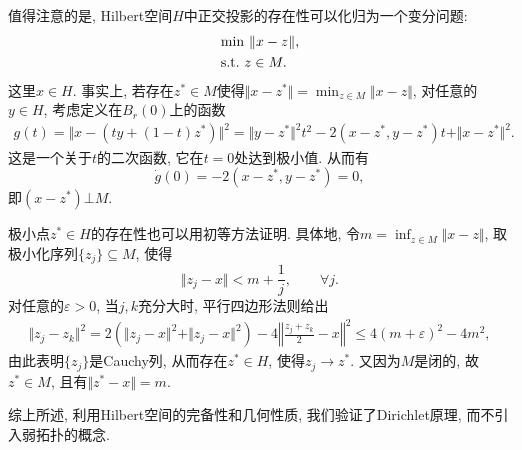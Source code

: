 值得注意的是, Hilbert空间$H$中正交投影的存在性可以化归为一个变分问题:
\begin{align*}
    &{\rm min}\ \Vert x - z \Vert, \\ 
    &{\rm s.t.}\ z \in M.
\end{align*}
这里$x \in H$. 事实上, 若存在$z^* \in M$使得$\Vert x - z^* \Vert = \min_{z \in M}\Vert x - z \Vert$, 对任意的$y \in H$, 考虑定义在$B_r(0)$上的函数 
\begin{align*}
    g(t) = \Vert x - (ty + (1 - t)z^*) \Vert^2 = \Vert y - z^* \Vert^2t^2 - 2(x - z^*, y - z^*)t + \Vert x - z^*\Vert^2.
\end{align*}
这是一个关于$t$的二次函数, 它在$t = 0$处达到极小值. 从而有 
\begin{equation*}
    \dot g(0) = -2(x - z^*, y - z^*) = 0,
\end{equation*}
即$(x - z^*) \bot M$.

极小点$z^* \in H$的存在性也可以用初等方法证明. 具体地, 令$m = \inf_{z \in M}\Vert x - z \Vert$, 取极小化序列$\{z_j\} \subseteq M$, 使得 
\begin{equation*}
    \Vert z_j - x \Vert < m + \frac{1}{j}, \qquad \forall j.
\end{equation*}
对任意的$\varepsilon > 0$, 当$j, k$充分大时, 平行四边形法则给出 
\begin{align*}
    \Vert z_j - z_k\Vert^2 = 2(\Vert z_j - x\Vert^2 + \Vert z_j - x \Vert^2) - 4\left\Vert \frac{z_j + z_k}{2} - x \right\Vert^2 \leq 4(m + \varepsilon)^2 - 4m^2,
\end{align*}
由此表明$\{z_j\}$是Cauchy列, 从而存在$z^* \in H$, 使得$z_j \rightarrow z^*$.
又因为$M$是闭的, 故$z^* \in M$, 且有$\Vert z^* - x \Vert = m$.

综上所述, 利用Hilbert空间的完备性和几何性质, 我们验证了Dirichlet原理, 而不引入弱拓扑的概念.
